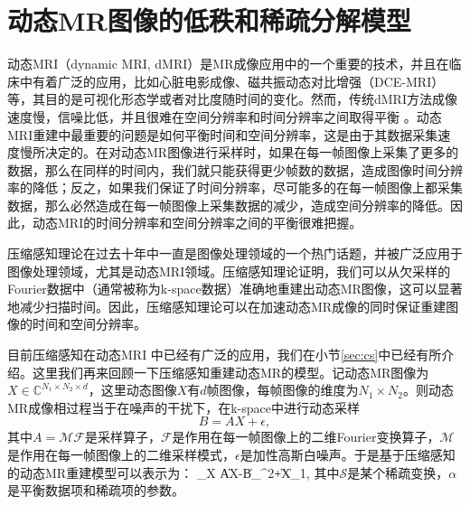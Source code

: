 
\chapter{动态MR图像的低秩和稀疏分解模型}
\label{chap:tgvlr}
动态MRI（dynamic MRI, dMRI）是MR成像应用中的一个重要的技术，并且在临床中有着广泛的应用，比如心脏电影成像、磁共振动态对比增强（DCE-MRI）\cite{Yankeelov2009}等，其目的是可视化形态学或者对比度随时间的变化。然而，传统dMRI方法成像速度慢，信噪比低，并且很难在空间分辨率和时间分辨率之间取得平衡 \cite{van1993, Jeffrey2003k, Tsao}。动态MRI重建中最重要的问题是如何平衡时间和空间分辨率，这是由于其数据采集速度慢所决定的。在对动态MR图像进行采样时，如果在每一帧图像上采集了更多的数据，那么在同样的时间内，我们就只能获得更少帧数的数据，造成图像时间分辨率的降低；反之，如果我们保证了时间分辨率，尽可能多的在每一帧图像上都采集数据，那么必然造成在每一帧图像上采集数据的减少，造成空间分辨率的降低。因此，动态MRI的时间分辨率和空间分辨率之间的平衡很难把握。

压缩感知理论\cite{Candes2006Robust}\cite{Donoho2006Compressed}在过去十年中一直是图像处理领域的一个热门话题，并被广泛应用于图像处理领域，尤其是动态MRI\cite{lustig2006,zhaobo,Sajan2011Accelerated,dmrics,kalman,lpluss,han}领域。压缩感知理论证明，我们可以从欠采样的Fourier数据中（通常被称为k-space数据）准确地重建出动态MR图像，这可以显著地减少扫描时间\cite{lustig2006, Lustig2008Compressed}。因此，压缩感知理论可以在加速动态MR成像的同时保证重建图像的时间和空间分辨率。

目前压缩感知在动态MRI\cite{zhaobo,Sajan2011Accelerated,dmrics,kalman,lpluss} 中已经有广泛的应用，我们在小节\ref{sec:cs}中已经有所介绍。这里我们再来回顾一下压缩感知重建动态MR的模型。记动态MR图像为$X\in \mathbb{C}^{N_1\times N_2\times d}$，这里动态图像$X$有$d$帧图像，每帧图像的维度为$N_1\times N_2$。则动态MR成像相过程当于在噪声的干扰下，在k-space中进行动态采样
$$B=AX+\epsilon,$$
其中$A=\mathcal{M}\mathcal{F}$是采样算子，$\mathcal{F}$是作用在每一帧图像上的二维Fourier变换算子，$\mathcal{M}$是作用在每一帧图像上的二维采样模式，$\epsilon$是加性高斯白噪声。于是基于压缩感知的动态MR重建模型可以表示为：
\beq
\min_X \|AX-B\|_{}^2+\alpha\|X\|_1,
\eeq
其中$\mathcal{S}$是某个稀疏变换，$\alpha$是平衡数据项和稀疏项的参数。

